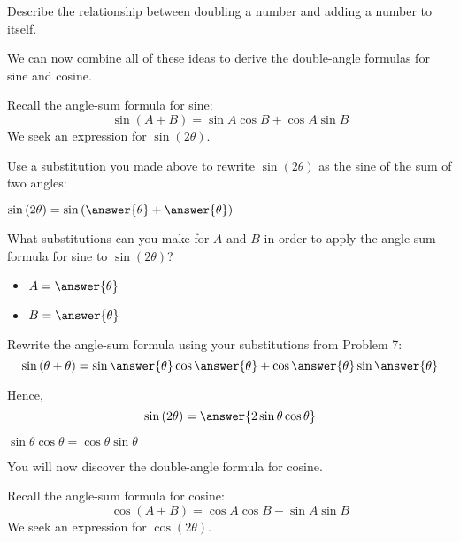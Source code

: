 \documentclass[numbers]{ximera}
\begin{document}
\begin{question}
Describe the relationship between doubling a number and adding a number to itself.
\begin{freeResponse}
\end{freeResponse}
\end{question}


We can now combine all of these ideas to derive the double-angle formulas for sine and cosine.

Recall the angle-sum formula for sine:
\[\sin \left(A+B\right) = \sin A \cos B + \cos A \sin B\]
We seek an expression for $\sin\left(2\theta\right)$.

\begin{problem}
Use a substitution you made above to rewrite $\sin\left(2\theta\right)$ as the sine of the sum of two angles:

$\sin\left(2\theta\right)=\sin\left(\answer{\theta}+\answer{\theta}\right)$
\end{problem}

\begin{problem}
What substitutions can you make for $A$ and $B$ in order to apply the angle-sum formula for sine to $\sin\left(2\theta\right)$?
\begin{itemize}
	\item $A=\answer{\theta}$
	\item $B=\answer{\theta}$
\end{itemize}
\end{problem}

\begin{problem}
Rewrite the angle-sum formula using your substitutions from Problem 7:
\[\sin\left(\theta+\theta\right)=\sin\answer{\theta}\cos\answer{\theta}+\cos\answer{\theta}\sin\answer{\theta}\]
\end{problem}

\begin{question}
Hence,
\[\sin\left(2\theta\right)=\answer{2\sin\theta\cos\theta}\]
\begin{hint}
$\sin\theta\cos\theta=\cos\theta\sin\theta$
\end{hint}
\end{question}

You will now discover the double-angle formula for cosine.

Recall the angle-sum formula for cosine:
\[\cos \left(A+B\right) = \cos A \cos B - \sin A \sin B\]
We seek an expression for $\cos\left(2\theta\right)$.
\end{document}
